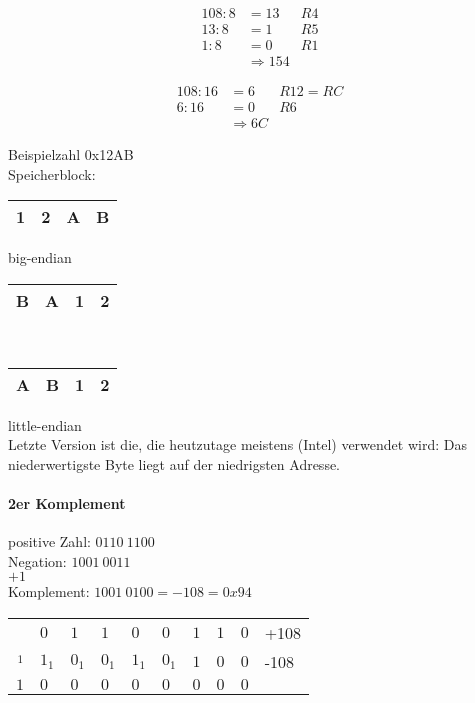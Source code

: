 \begin{align*}
108:8 &= 13 &R4\\
13:8 &= 1 &R5\\
1:8 &= 0 &R1\\
&\Rightarrow 154&
\end{align*}

\begin{align*}
108: 16 &= 6 &R12 = RC\\
6:16 &= 0 &R6\\
&\Rightarrow 6C&
\end{align*}

Beispielzahl 0x12AB\\

Speicherblock:\\
\begin{tabular}{|l|l|l|l|}
\hline
1&2&A&B\\
\hline
\end{tabular} big-endian\\
\begin{tabular}{|l|l|l|l|}
\hline
B&A&1&2\\
\hline
\end{tabular}\\
\begin{tabular}{|l|l|l|l|}
\hline
A&B&1&2\\
\hline
\end{tabular} little-endian\\
Letzte Version ist die, die heutzutage meistens (Intel) verwendet wird: Das niederwertigste Byte liegt auf der niedrigsten Adresse.

\paragraph{2er Komplement}
positive Zahl: $\boxed{0}110 \: 1100$\\
Negation: $1001\: 0011$\\
$+1$\\
Komplement: $1001 \: 0100 = -108 = 0x94$\\
\begin{tabular}{r | l l l l l l l l l}
 & $0$&$1$&$1$&$0$&$0$&$1$&$1$&$0$ & +108\\
$_1$&$1_1$&$0_1$&$0_1$&$1_1$&$0_1$&$1$&$0$&$0$ & -108\\
\hline
$1$&$0$&$0$&$0$&$0$&$0$&$0$&$0$&$0$&\\

\end{tabular}

